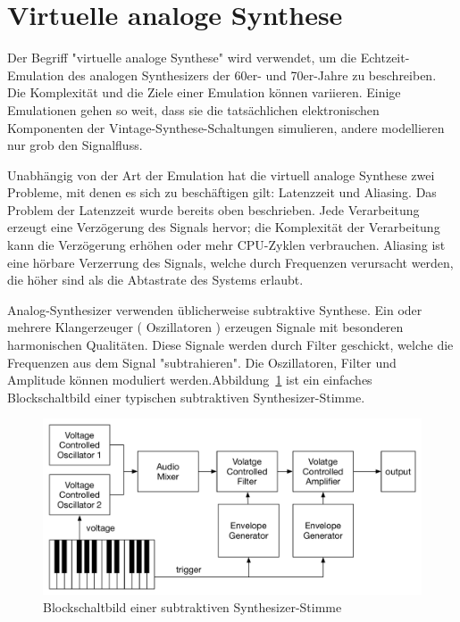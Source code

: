 \section{Virtuelle analoge Synthese}

Der Begriff  "virtuelle analoge Synthese" wird verwendet, um die Echtzeit-Emulation des analogen Synthesizers der 60er- und 70er-Jahre zu beschreiben. Die Komplexität und die Ziele einer Emulation können variieren. Einige Emulationen gehen so weit, dass sie die tatsächlichen elektronischen Komponenten der Vintage-Synthese-Schaltungen simulieren, andere modellieren nur grob den Signalfluss.

Unabhängig von der Art der Emulation hat die virtuell analoge Synthese zwei Probleme, mit denen es sich zu beschäftigen gilt:  Latenzzeit und Aliasing. Das Problem der Latenzzeit wurde bereits oben beschrieben. Jede Verarbeitung erzeugt  eine Verzögerung des Signals hervor; die Komplexität der Verarbeitung kann die Verzögerung erhöhen oder mehr CPU-Zyklen verbrauchen. Aliasing ist eine hörbare Verzerrung des Signals, welche durch Frequenzen verursacht werden, die höher sind als die Abtastrate des Systems erlaubt.

Analog-Synthesizer verwenden üblicherweise subtraktive Synthese. Ein oder mehrere Klangerzeuger ( Oszillatoren ) erzeugen Signale mit besonderen harmonischen Qualitäten. Diese Signale werden durch Filter geschickt, welche die Frequenzen aus dem Signal "subtrahieren". Die Oszillatoren, Filter und Amplitude können moduliert werden.Abbildung~\ref{fig:synth_voice_block} ist ein einfaches Blockschaltbild einer typischen subtraktiven Synthesizer-Stimme.

\begin{figure}[H]
    \centering
    \includegraphics[width=\textwidth]{assets/synth_voice_block.pdf}
    \caption{Blockschaltbild einer subtraktiven Synthesizer-Stimme}
    \label{fig:synth_voice_block}
\end{figure}

